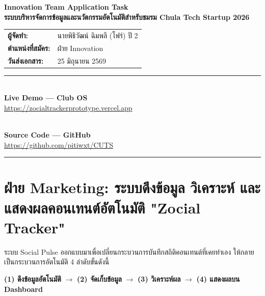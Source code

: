 \documentclass[10pt,a4paper]{article}
\begin{document}
\begin{center}
  \vspace*{0.3cm}
  {\Huge\bfseries\chulafont\color{chulapink} Innovation Team Application Task}\\[0.1cm]
  {\Large\bfseries\chulafont\color{darkblue}ระบบบริหารจัดการข้อมูลและนวัตกรรมอัตโนมัติสําหรับชมรม Chula Tech Startup 2026 }\\[0.3cm]
  \begin{tabular}{ll}
    \textbf{ผู้จัดทำ:} & นายพิธิวัฒน์ ฉิมพลี (โฟร์) ปี 2 \\
    \textbf{ตำแหน่งที่สมัคร:} & ฝ่าย Innovation \\
    \textbf{วันส่งเอกสาร:} & 25 มิถุนายน 2569 \\
  \end{tabular}
  \vskip 0.3cm
  \hrule
  \vskip 0.4cm
  \begin{minipage}{0.44\textwidth}
    \centering
    \\[0.2cm]
    {\small\bfseries\color{chulapink} Live Demo — Club OS}\\[0.05cm]
    {\footnotesize\url{https://zocialtrackerprototype.vercel.app}}
  \end{minipage}
  \hfill
  \begin{minipage}{0.44\textwidth}
    \centering
    \\[0.2cm]
    {\small\bfseries\color{darkblue} Source Code — GitHub}\\[0.05cm]
    {\footnotesize\url{https://github.com/pitiwxt/CUTS}}
  \end{minipage}
  \vskip 0.3cm
  \hrule
\end{center}

\section{ฝ่าย Marketing: ระบบดึงข้อมูล วิเคราะห์ และแสดงผลคอนเทนต์อัตโนมัติ "Zocial Tracker"}

\noindent ระบบ Social Pulse ออกแบบมาเพื่อเปลี่ยนกระบวนการบันทึกสถิติคอนเทนต์ที่เคยทำเอง ให้กลายเป็นกระบวนการอัตโนมัติ 4 ลำดับขั้นดังนี้

\begin{center}
  \textbf{(1) ดึงข้อมูลอัตโนมัติ} $\longrightarrow$ \textbf{(2) จัดเก็บข้อมูล} $\longrightarrow$ \textbf{(3) วิเคราะห์ผล} $\longrightarrow$ \textbf{(4) แสดงผลบน Dashboard}
\end{center}
\end{document}

